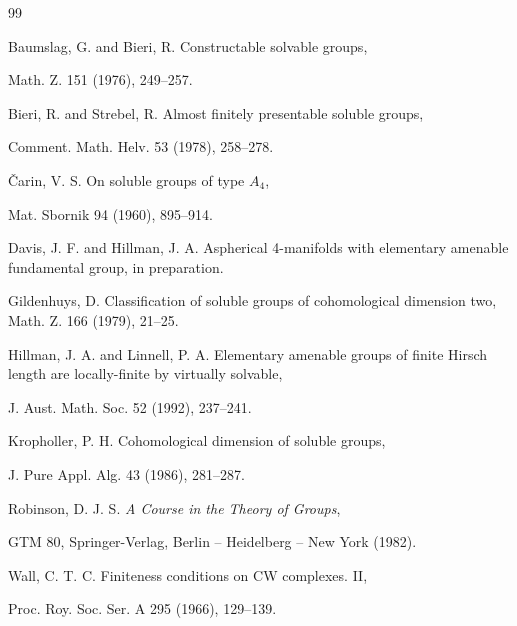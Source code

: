 \documentclass[12pt]{amsart}
\begin{document}
\begin{thebibliography}{99}

 Baumslag, G. and Bieri, R. 
Constructable solvable groups,
 
 Math. Z. 151 (1976), 249--257.

 Bieri, R. and Strebel, R. 
Almost finitely presentable soluble groups,
 
Comment. Math. Helv. 53 (1978), 258--278.

 \v Carin,  V. S.  On soluble groups of type $A_4$,

Mat. Sbornik 94 (1960), 895--914.

 Davis, J.  F.  and Hillman, J.  A.  Aspherical 4-manifolds with 
elementary amenable fundamental group,
in preparation.

  Gildenhuys, D. Classification of soluble groups of cohomological dimension two,
Math. Z. 166 (1979), 21--25.

 Hillman, J.  A. and Linnell, P.  A. 
Elementary amenable groups of finite
Hirsch length are locally-finite by virtually solvable,

J. Aust. Math. Soc. 52 (1992), 237--241.

 Kropholler, P.  H. 
Cohomological dimension of soluble groups,

J. Pure Appl. Alg. 43 (1986), 281--287.

 Robinson, D.  J.  S. 
\textit{A Course in the Theory of Groups},

GTM 80, Springer-Verlag, Berlin  -- Heidelberg -- New York (1982).

 Wall, C. T. C. Finiteness conditions on CW complexes. II,

Proc. Roy. Soc. Ser. A 295 (1966), 129--139.

\end{thebibliography}
\end{document}
